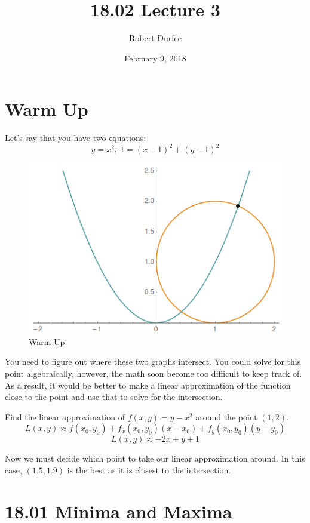 \documentclass{article}
\title{ 18.02 Lecture 3 }
\author{ Robert Durfee }
\date{ February 9, 2018 }
\begin{document}
\maketitle

\section{ Warm Up }

Let's say that you have two equations:
$$ y = x^{2}, \ 1 = (x - 1)^{2} + (y - 1)^{2}  $$

\begin{figure}[H]
  \centering
  \includegraphics[scale=0.60]{"WarmUp"}
  \caption{Warm Up}
\end{figure}

You need to figure out where these two graphs intersect. You could solve for
this point algebraically, however, the math soon become too difficult to keep
track of. As a result, it would be better to make a linear approximation of the
function close to the point and use that to solve for the intersection.

\bigbreak

Find the linear approximation of $f(x, y) = y - x^{2}$ around the point $(1,
2)$.
$$ L(x, y) \approx f(x_{0}, y_{0}) + f_{x}(x_{0}, y_{0}) (x - x_{0}) +
f_{y}(x_{0}, y_{0}) (y - y_{0})$$
$$ L(x, y) \approx -2x + y + 1 $$

Now we must decide which point to take our linear approximation around. In this
case, $(1.5, 1.9)$ is the best as it is closest to the intersection.

\section{18.01 Minima and Maxima}
\end{document}
